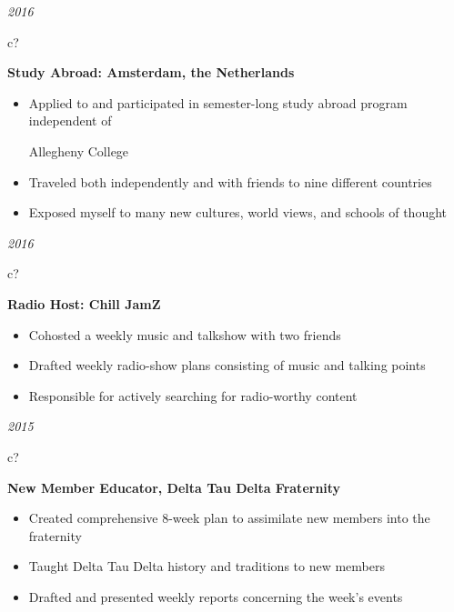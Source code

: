\documentclass[12pt,a4paper,sans]{moderncv} %
\begin{document}
   \hspace{11 mm}
 \textit{2016}
\hspace{2 mm}
\begin{tabular}{c?}
 \\
\end{tabular}
 \hspace{2 mm}
 \textbf{Study Abroad: Amsterdam, the Netherlands} 
 \vspace{0 mm}
 \begin{itemize}
 \addtolength{\itemindent}{31.7 mm}
 \item{Applied to and participated in semester-long study abroad program independent of 
 
  \hspace{31.7 mm}Allegheny College}
  
  
 \item{Traveled both independently and with friends to nine different countries}
 \item{Exposed myself to many new cultures, world views, and schools of thought}
 \end{itemize}
 
    \hspace{11 mm}
 \textit{2016}
\hspace{2 mm}
\begin{tabular}{c?}
 \\
\end{tabular}
 \hspace{2 mm}
 \textbf{Radio Host: Chill JamZ} 
 \vspace{0 mm}
 \begin{itemize}
 \addtolength{\itemindent}{31.7 mm}
 \item{Cohosted a weekly music and talkshow with two friends}
 \item{Drafted weekly radio-show plans consisting of music and talking points}
 \item{Responsible for actively searching for radio-worthy content}
 \end{itemize}
 
  \hspace{11 mm}
 \textit{2015}
\hspace{2 mm}
\begin{tabular}{c?}
 \\
\end{tabular}
 \hspace{2 mm}
 \textbf{New Member Educator, Delta Tau Delta Fraternity} 
 \vspace{0 mm}
 \begin{itemize}
 \addtolength{\itemindent}{31.7 mm}
 \item{Created comprehensive 8-week plan to assimilate new members into the fraternity}
 \item{Taught Delta Tau Delta history and traditions to new members}
 \item{Drafted and presented weekly reports concerning the week's events}
 \end{itemize}
 
\end{document}
